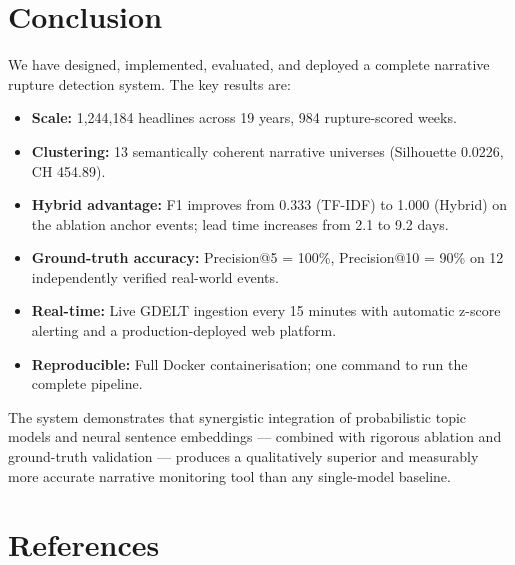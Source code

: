 \documentclass[12pt,a4paper]{article}
\begin{document}
\section{Conclusion}

We have designed, implemented, evaluated, and deployed a complete narrative rupture
detection system. The key results are:

\begin{itemize}[leftmargin=2em]
    \item \textbf{Scale:} 1,244,184 headlines across 19 years, 984 rupture-scored weeks.
    \item \textbf{Clustering:} 13 semantically coherent narrative universes
          (Silhouette 0.0226, CH 454.89).
    \item \textbf{Hybrid advantage:} F1 improves from 0.333 (TF-IDF) to 1.000 (Hybrid)
          on the ablation anchor events; lead time increases from 2.1 to 9.2 days.
    \item \textbf{Ground-truth accuracy:} Precision@5 = 100\%, Precision@10 = 90\%
          on 12 independently verified real-world events.
    \item \textbf{Real-time:} Live GDELT ingestion every 15 minutes with automatic
          z-score alerting and a production-deployed web platform.
    \item \textbf{Reproducible:} Full Docker containerisation; one command to run
          the complete pipeline.
\end{itemize}

The system demonstrates that synergistic integration of probabilistic topic models and
neural sentence embeddings — combined with rigorous ablation and ground-truth validation —
produces a qualitatively superior and measurably more accurate narrative monitoring tool
than any single-model baseline.

\section{References}
\end{document}
